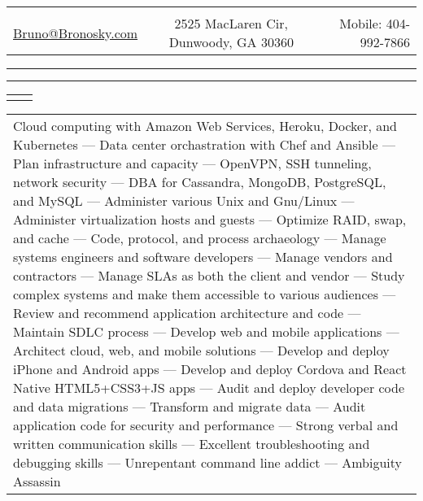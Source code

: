 \documentclass[letterpaper,10pt]{article}
\newcommand{\lineDouble}[0]{\hrule\vspace{2pt}\hrule\vspace{1.5pt}}
\newcommand{\sizeF}[0]{\fontsize{11pt}{13pt}\selectfont}
\newcommand{\heading}[4]{
    \begin{tabularx}{\textwidth}{LCR}
        &\huge{\textbf{\sc{#1}}}&\\
        \href{mailto:#2}{#2} & #3 & Mobile: #4\\
    \end{tabularx}
    \lineDouble
    \vspace{5pt}%
}
\newcounter{skipfirstcounter}
\newcommand{\blocktitle}[1]{
    \setcounter{skipfirstcounter}{0}
    \begin{tabularx}{\textwidth}{lR}
        {\sizeF\sc{#1}} & \noindent\hrulefill\\
    \end{tabularx}
}
\newcommand{\blockOverview}[1]{%
    \blocktitle{Overview}%
    \vspace{0.4mm}%
    \begin{tabular*}{\textwidth}{p{\textwidth}}%
        #1%
    \end{tabular*}%
    \vspace{2mm}%
}%
\begin{document}
\heading{Bruno Bronosky}
{Bruno@Bronosky.com}
{2525 MacLaren Cir, Dunwoody, GA 30360}
{404-992-7866}

\blockOverview{
    Cloud computing with Amazon Web Services, Heroku, Docker, and Kubernetes ---
    Data center orchastration with Chef and Ansible ---
    Plan infrastructure and capacity ---
    OpenVPN, SSH tunneling, network security ---
    DBA for Cassandra, MongoDB, PostgreSQL, and MySQL ---
    Administer various Unix and Gnu/Linux ---
    Administer virtualization hosts and guests ---
    Optimize RAID, swap, and cache ---
    Code, protocol, and process archaeology ---
    Manage systems engineers and software developers ---
    Manage vendors and contractors ---
    Manage SLAs as both the client and vendor ---
    Study complex systems and make them accessible to various audiences ---
    Review and recommend application architecture and code ---
    Maintain SDLC process ---
    Develop web and mobile applications ---
    Architect cloud, web, and mobile solutions ---
    Develop and deploy iPhone and Android apps ---
    Develop and deploy Cordova and React Native HTML5+CSS3+JS apps ---
    Audit and deploy developer code and data migrations ---
    Transform and migrate data ---
    Audit application code for security and performance ---
    Strong verbal and written communication skills ---
    Excellent troubleshooting and debugging skills ---
    Unrepentant command line addict ---
    Ambiguity Assassin
}
\end{document}
